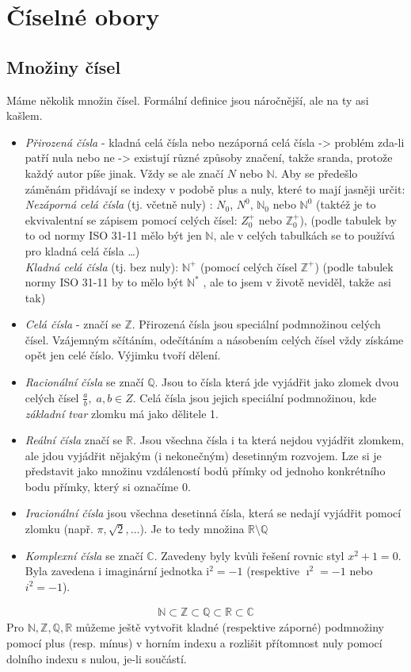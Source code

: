 \documentclass[12pt]{article}
\newcommand{\iu}{\mathrm{i}} %
\begin{document}
\section{Číselné obory}
\subsection{Množiny čísel}
Máme několik množin čísel. Formální definice jsou náročnější, ale na ty asi kašlem.
\begin{itemize}
\item \emph{Přirozená čísla} - kladná celá čísla nebo nezáporná celá čísla -> problém zda-li patří nula nebo ne -> existují různé způsoby značení, takže sranda, protože každý autor píše jinak. Vždy se ale značí $N$ nebo $\mathbb{N}$. Aby se předešlo záměnám přidávají se indexy v podobě plus a nuly, které to mají jasněji určit:\\
\emph{Nezáporná celá čísla} (tj. včetně nuly)	: $N_0$, $N^0$, $\mathbb{N}_0$ nebo $\mathbb{N}^0 $ (taktéž je to ekvivalentní se zápisem pomocí celých čísel: $Z_0^+$ nebo $\mathbb{Z}_0^+$), (podle tabulek by to od normy ISO 31-11 mělo být jen $\mathbb{N}$, ale v celých tabulkách se to používá pro kladná celá čísla \dots)\\
\emph{Kladná celá čísla} (tj. bez nuly): $\mathbb{N}^+$ (pomocí celých čísel $\mathbb{Z}^+$) (podle tabulek normy ISO 31-11 by to mělo být $\mathbb{N}^*$ , ale to jsem v životě neviděl, takže asi tak)
\item \emph{Celá čísla} - značí se $\mathbb{Z}$. Přirozená čísla jsou speciální podmnožinou celých čísel. Vzájemným sčítáním, odečítáním a násobením celých čísel vždy získáme opět jen celé číslo. Výjimku tvoří dělení.
\item \emph{Racionální čísla} se značí $\mathbb{Q}$. Jsou to čísla která jde vyjádřit jako zlomek dvou celých čísel $\frac{a}{b},\; a,b \in Z$. Celá čísla jsou jejich speciální podmnožinou, kde \emph{základní tvar} zlomku má jako dělitele 1.
\item \emph{Reální čísla} značí se $\mathbb{R}$. Jsou všechna čísla i ta která nejdou vyjádřit zlomkem, ale jdou vyjádřit nějakým (i nekonečným) desetinným rozvojem. Lze si je představit jako množinu vzdáleností bodů přímky od jednoho konkrétního bodu přímky, který si označíme 0.
\item \emph{Iracionální čísla} jsou všechna desetinná čísla, která se nedají vyjádřit pomocí zlomku (např. $\pi, \sqrt{2}, \dotsc$). Je to tedy množina $\mathbb{R} \setminus \mathbb{Q}$
\item \emph{Komplexní čísla} se značí $\mathbb{C}$. Zavedeny byly kvůli řešení rovnic styl $x^2 + 1 = 0$. Byla zavedena $	\iu$ imaginární jednotka $\iu^2 = -1$ (respektive $\imath^2 = -1$  nebo $i^2 = -1$).
\end{itemize}
\begin{align}
\mathbb{N} \subset \mathbb{Z} \subset \mathbb{Q} \subset \mathbb{R} \subset \mathbb{C}
\end{align}
Pro $\mathbb{N}, \mathbb{Z}, \mathbb{Q}, \mathbb{R}$ můžeme ještě vytvořit kladné (respektive záporné) podmnožiny pomocí plus (resp. mínus) v horním indexu a rozlišit přítomnost nuly pomocí dolního indexu s nulou, je-li součástí.
\end{document}
